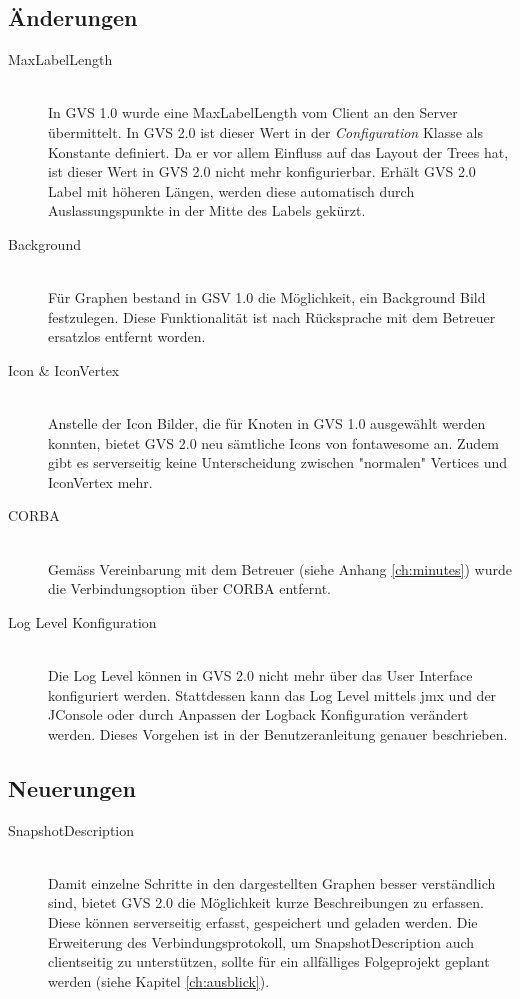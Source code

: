 \documentclass[11pt,a4paper,english,oneside]{book}
\numberwithin{equation}{chapter}
\begin{document}
	\subsection{Änderungen}
	\begin{description}
		\item[MaxLabelLength] \hfill \\
		In GVS 1.0 wurde eine MaxLabelLength vom Client an den Server übermittelt. In GVS 2.0 ist dieser Wert in der \textit{Configuration} Klasse als Konstante definiert. Da er vor allem Einfluss auf das Layout der Trees hat, ist dieser Wert in GVS 2.0 nicht mehr konfigurierbar. Erhält GVS 2.0 Label mit höheren Längen, werden diese automatisch durch Auslassungspunkte in der Mitte des Labels gekürzt.
		\item[Background] \hfill \\ 
		Für Graphen bestand in GSV 1.0 die Möglichkeit, ein Background Bild festzulegen. Diese Funktionalität ist nach Rücksprache mit dem Betreuer ersatzlos entfernt worden.
		\item[Icon \& IconVertex] \hfill \\
		Anstelle der Icon Bilder, die für Knoten in GVS 1.0 ausgewählt werden konnten, bietet GVS 2.0 neu sämtliche Icons von \gls{fontawesome} \cite{fontawesome} an. Zudem gibt es serverseitig keine Unterscheidung zwischen "normalen" Vertices und IconVertex mehr.
		\item[CORBA] \hfill \\
		Gemäss Vereinbarung mit dem Betreuer (siehe Anhang \ref{ch:minutes}) wurde die Verbindungsoption über CORBA entfernt.
		\item[Log Level Konfiguration] \hfill \\
		Die Log Level können in GVS 2.0 nicht mehr über das User Interface konfiguriert werden. Stattdessen kann das Log Level mittels \gls{jmx} und der JConsole oder durch Anpassen der Logback Konfiguration verändert werden. Dieses Vorgehen ist in der Benutzeranleitung genauer beschrieben.
	\end{description}

	\subsection{Neuerungen}
	\begin{description}
		\item[SnapshotDescription] \hfill \\ Damit einzelne Schritte in den dargestellten Graphen besser verständlich sind, bietet GVS 2.0 die Möglichkeit kurze Beschreibungen zu erfassen. Diese können serverseitig erfasst, gespeichert und geladen werden. Die Erweiterung des Verbindungsprotokoll, um SnapshotDescription auch clientseitig zu unterstützen, sollte für ein allfälliges Folgeprojekt geplant werden (siehe Kapitel \ref{ch:ausblick}).
	\end{description}
	
\end{document}
